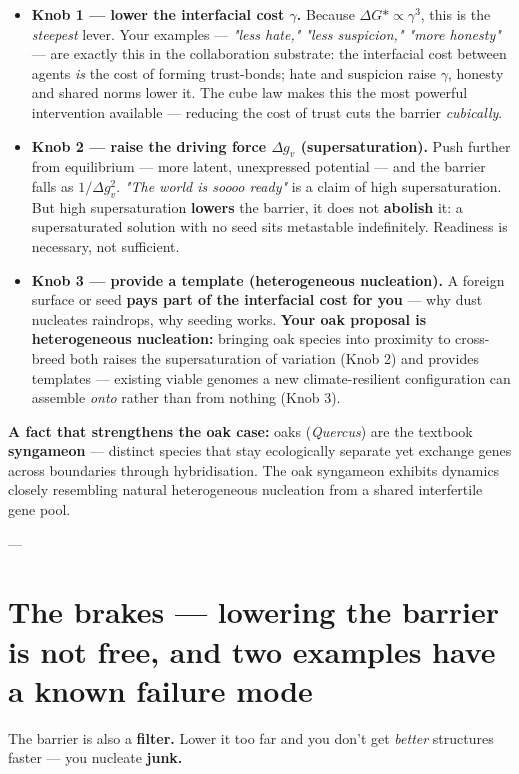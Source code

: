 \documentclass{article}
\begin{document}
\begin{itemize}
    \item \textbf{Knob 1 --- lower the interfacial cost $\gamma$.} Because $\Delta G* \propto \gamma^3$, this is the \textit{steepest} lever. Your examples --- \textit{"less hate," "less suspicion," "more honesty"} --- are exactly this in the collaboration substrate: the interfacial cost between agents \textit{is} the cost of forming trust-bonds; hate and suspicion raise $\gamma$, honesty and shared norms lower it. The cube law makes this the most powerful intervention available --- reducing the cost of trust cuts the barrier \textit{cubically}.

    \item \textbf{Knob 2 --- raise the driving force $\Delta g_v$ (supersaturation).} Push further from equilibrium --- more latent, unexpressed potential --- and the barrier falls as $1/\Delta g_v^2$. \textit{"The world is soooo ready"} is a claim of high supersaturation. But high supersaturation \textbf{lowers} the barrier, it does not \textbf{abolish} it: a supersaturated solution with no seed sits metastable indefinitely. Readiness is necessary, not sufficient.

    \item \textbf{Knob 3 --- provide a template (heterogeneous nucleation).} A foreign surface or seed \textbf{pays part of the interfacial cost for you} --- why dust nucleates raindrops, why seeding works. \textbf{Your oak proposal is heterogeneous nucleation:} bringing oak species into proximity to cross-breed both raises the supersaturation of variation (Knob 2) and provides templates --- existing viable genomes a new climate-resilient configuration can assemble \textit{onto} rather than from nothing (Knob 3).
\end{itemize}

\textbf{A fact that strengthens the oak case:} oaks (\textit{Quercus}) are the textbook \textbf{syngameon} --- distinct species that stay ecologically separate yet exchange genes across boundaries through hybridisation. The oak syngameon exhibits dynamics closely resembling natural heterogeneous nucleation from a shared interfertile gene pool.

---
\section{The brakes --- lowering the barrier is not free, and two examples have a known failure mode}
The barrier is also a \textbf{filter.} Lower it too far and you don't get \textit{better} structures faster --- you nucleate \textbf{junk.}
\end{document}
